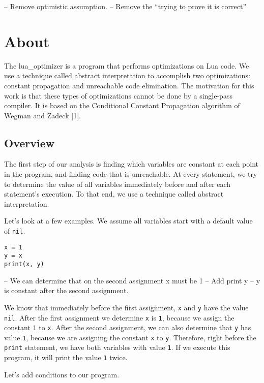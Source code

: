\documentclass[
]{article}
\author{}
\date{}
\begin{document}
-- Remove optimistic assumption. -- Remove the ``trying to prove it is
correct''

\hypertarget{about}{%
\section{About}\label{about}}

The lua\_optimizer is a program that performs optimizations on Lua code.
We use a technique called abstract interpretation to accomplish two
optimizations: constant propagation and unreachable code elimination.
The motivation for this work is that these types of optimizations cannot
be done by a single-pass compiler. It is based on the Conditional
Constant Propagation algorithm of Wegman and Zadeck {[}1{]}.

\hypertarget{overview}{%
\subsection{Overview}\label{overview}}

The first step of our analysis is finding which variables are constant
at each point in the program, and finding code that is unreachable. At
every statement, we try to determine the value of all variables
immediately before and after each statement's execution. To that end, we
use a technique called abstract interpretation.

Let's look at a few examples. We assume all variables start with a
default value of \texttt{nil}.

\begin{verbatim}
x = 1
y = x
print(x, y)
\end{verbatim}

-- We can determine that on the second assignment x must be 1 -- Add
print y -- y is constant after the second assignment.

We know that immediately before the first assignment, \texttt{x} and
\texttt{y} have the value \texttt{nil}. After the first assignment we
determine \texttt{x} is \texttt{1}, because we assign the constant
\texttt{1} to \texttt{x}. After the second assignment, we can also
determine that \texttt{y} has value \texttt{1}, because we are assigning
the constant \texttt{x} to \texttt{y}. Therefore, right before the
\texttt{print} statement, we have both variables with value \texttt{1}.
If we execute this program, it will print the value \texttt{1} twice.

Let's add conditions to our program.
\end{document}

